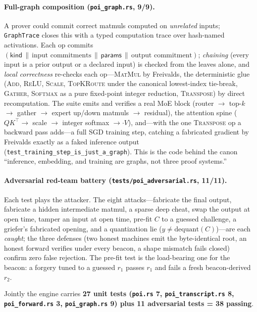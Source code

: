 \paragraph{Full-graph composition (\texttt{poi\_graph.rs}, 9/9).} A prover could commit
correct matmuls computed on \emph{unrelated} inputs; \texttt{GraphTrace} closes this with a
typed computation trace over hash-named activations. Each op commits
$(\mathsf{kind}\,\|\,\text{input commitments}\,\|\,\mathsf{params}\,\|\,\text{output
commitment})$; \emph{chaining} (every input is a prior output or a declared input) is
checked from the leaves alone, and \emph{local correctness} re-checks each op---\textsc{MatMul}
by Freivalds, the deterministic glue (\textsc{Add}, \textsc{ReLU}, \textsc{Scale},
\textsc{TopKRoute} under the canonical lowest-index tie-break, \textsc{Gather},
\textsc{Softmax} as a pure fixed-point integer reduction, \textsc{Transpose}) by direct
recomputation. The suite emits and verifies a real MoE block (router $\to$ top-$k$ $\to$
gather $\to$ expert up/down matmuls $\to$ residual), the attention spine
($QK^\top\to$ scale $\to$ integer softmax $\to\cdot V$), and---with the one
\textsc{Transpose} op a backward pass adds---a full SGD training step, catching a fabricated
gradient by Freivalds exactly as a faked inference output
(\texttt{test\_training\_step\_is\_just\_a\_graph}). This is the code behind the canon
``inference, embedding, and training are graphs, not three proof systems.''

\paragraph{Adversarial red-team battery (\texttt{tests/poi\_adversarial.rs}, 11/11).} Each
test plays the attacker. The eight attacks---fabricate the final output, fabricate a hidden
intermediate matmul, a sparse deep cheat, swap the output at open time, tamper an input at
open time, pre-fit $C$ to a guessed challenge, a griefer's fabricated opening, and a
quantization lie ($y\neq\mathrm{dequant}(C)$)---are each \emph{caught}; the three defenses
(two honest machines emit the byte-identical root, an honest forward verifies under every
beacon, a shape mismatch fails closed) confirm zero false rejection. The pre-fit test is the
load-bearing one for the beacon: a forgery tuned to a guessed $r_1$ passes $r_1$ and fails a
fresh beacon-derived $r_2$.

Jointly the engine carries \textbf{27 unit tests (\texttt{poi.rs} 7, \texttt{poi\_transcript.rs}
8, \texttt{poi\_forward.rs} 3, \texttt{poi\_graph.rs} 9) plus 11 adversarial tests = 38
passing}.

